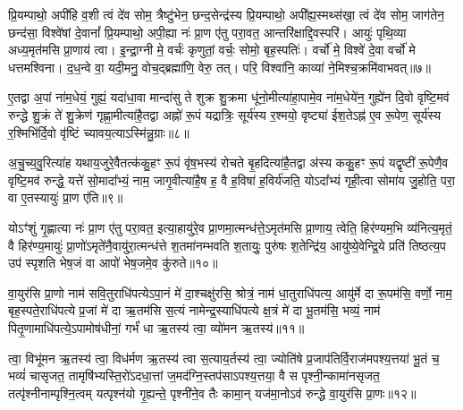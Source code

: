 प्रि॒यम्पाथो॒ अपी॑हि व॒शी त्वं दे॑व सोम॒ त्रैष्टु॑भेन॒ छन्द॒सेन्द्र॑स्य प्रि॒यम्पाथो॒ अपी᳚ह्य॒स्मथ्स॑खा॒ त्वं दे॑व सोम॒ जाग॑तेन॒ छन्द॑सा॒ विश्वे॑षां दे॒वानां᳚ प्रि॒यम्पाथो॒ अपी॒ह्या नः॑ प्रा॒ण ए॑तु परा॒वत॒ आन्तरि॑क्षाद्दि॒वस्परि॑। आयुः॑ पृथि॒व्या अध्य॒मृत॑मसि प्रा॒णाय॑ त्वा। इ॒न्द्रा॒ग्नी मे॒ वर्चः॑ कृणुतां॒ वर्चः॒ सोमो॒ बृह॒स्पतिः॑। वर्चो॑ मे॒ विश्वे॑ दे॒वा वर्चो॑ मे धत्तमश्विना। द॒ध॒न्वे वा॒ यदी॒मनु॒ वोच॒द्ब्रह्मा॑णि॒ वेरु॒ तत्। परि॒ विश्वा॑नि॒ काव्या॑ ने॒मिश्च॒क्रमि॑वाभवत्॥७॥

{\anuvakamend[{शक्व॑रीष्व॒ग्नेर्बृह॒स्पतिः॒ पञ्च॑विꣳशतिश्च॥३॥}]}

ए॒तद्वा अ॒पां ना॑म॒धेयं॒ गुह्यं॒ यदा॑धा॒वा मान्दा॑सु ते शुक्र शु॒क्रमा धू॑नो॒मीत्या॑हा॒पामे॒व ना॑म॒धेये॑न॒ गुह्ये॑न दि॒वो वृष्टि॒मव॑ रुन्द्धे शु॒क्रं ते॑ शु॒क्रेण॑ गृह्णा॒मीत्या॑है॒तद्वा अह्नो॑ रू॒पं यद्रात्रिः॒ सूर्य॑स्य र॒श्मयो॒ वृष्ट्या॑ ईश॒ते\-ऽह्न॑ ए॒व रू॒पेण॒ सूर्य॑स्य र॒श्मिभि॑र्दि॒वो वृ॑ष्टिं च्यावय॒त्या\-ऽस्मि॑न्नु॒ग्राः॥८॥

अ॒चु॒च्य॒वु॒रित्या॑ह यथाय॒जुरे॒वैतत्क॑कु॒हꣳ रू॒पं वृ॑ष॒भस्य॑ रोचते बृ॒हदित्या॑है॒तद्वा अ॑स्य ककु॒हꣳ रू॒पं यद्वृष्टी॑ रू॒पेणै॒व वृष्टि॒मव॑ रुन्द्धे॒ यत्ते॑ सो॒मादा᳚भ्यं॒ नाम॒ जागृ॒वीत्या॑है॒ष ह॒ वै ह॒विषा॑ ह॒विर्य॑जति॒ यो\-ऽदा᳚भ्यं गृही॒त्वा सोमा॑य जु॒होति॒ परा॒ वा ए॒तस्यायुः॑ प्रा॒ण ए॑ति॥९॥

यो\-ऽꣳ॑शुं गृ॒ह्णात्या नः॑ प्रा॒ण ए॑तु परा॒वत॒ इत्या॒हायु॑रे॒व प्रा॒णमा॒त्मन्ध॑त्ते॒\-ऽमृत॑मसि प्रा॒णाय॒ त्वेति॒ हिर॑ण्यम॒भि व्य॑नित्य॒मृतं॒ वै हिर॑ण्य॒मायुः॑ प्रा॒णो॑\-ऽमृते॑नै॒वायु॑रा॒त्मन्ध॑त्ते श॒तमा॑नम्भवति श॒तायुः॒ पुरु॑षः श॒तेन्द्रि॑य॒ आयु॑ष्ये॒वेन्द्रि॒ये प्रति॑ तिष्ठत्य॒प उप॑ स्पृशति भेष॒जं वा आपो॑ भेष॒जमे॒व कु॑रुते॥१०॥

{\anuvakamend[{उ॒ग्रा ए॒त्याप॒स्त्रीणि॑ च॥४॥}]}

वा॒युर॑सि प्रा॒णो नाम॑ सवि॒तुराधि॑पत्ये\-ऽपा॒नं मे॑ दा॒श्चक्षु॑रसि॒ श्रोत्रं॒ नाम॑ धा॒तुराधि॑पत्य॒ आयु॑र्मे दा रू॒पम॑सि॒ वर्णो॒ नाम॒ बृह॒स्पते॒राधि॑पत्ये प्र॒जां मे॑ दा ऋ॒तम॑सि स॒त्यं नामेन्द्र॒स्याधि॑पत्ये क्ष॒त्रं मे॑ दा भू॒तम॑सि॒ भव्यं॒ नाम॑ पितृ॒णामाधि॑पत्ये॒\-ऽपामोष॑धीनां॒ गर्भं॑ धा ऋ॒तस्य॑ त्वा॒ व्यो॑मन ऋ॒तस्य॑॥११॥

त्वा॒ विभू॑मन ऋ॒तस्य॑ त्वा॒ विध॑र्मण ऋ॒तस्य॑ त्वा स॒त्याय॒र्तस्य॑ त्वा॒ ज्योति॑षे प्र॒जाप॑तिर्वि॒राज॑मपश्य॒त्तया॑ भू॒तं च॒ भव्यं॑ चासृजत॒ तामृषि॑भ्यस्ति॒रो॑\-ऽदधा॒त्तां ज॒मद॑ग्नि॒स्तप॑सा\-ऽपश्य॒त्तया॒ वै स पृश्नी॒न्कामा॑नसृजत॒ तत्पृ॑श्नीनाम्पृश्नि॒त्वम् यत्पृश्न॑यो गृ॒ह्यन्ते॒ पृश्नी॑ने॒व तैः कामा॒न् यज॑मा॒नो\-ऽव॑ रुन्द्धे वा॒युर॑सि प्रा॒णः॥१२॥

